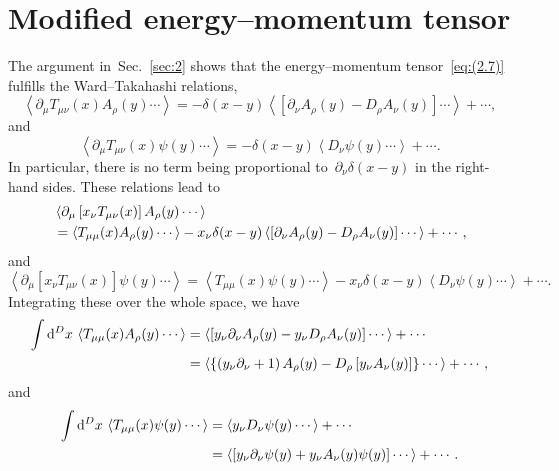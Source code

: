 \section{Modified energy--momentum tensor}
\label{sec:E}
The argument in~Sec.~\ref{sec:2} shows that the energy--momentum
tensor~\eqref{eq:(2.7)} fulfills the Ward--Takahashi relations,
\begin{equation}
   \left\langle\partial_\mu T_{\mu\nu}(x)A_\rho(y)\dotsm\right\rangle
   =-\delta(x-y)
   \left\langle\left[\partial_\nu A_\rho(y)
   -D_\rho A_\nu(y)\right]\dotsm\right\rangle+\dotsb,
\label{eq:(E1)}
\end{equation}
and
\begin{equation}
   \left\langle\partial_\mu T_{\mu\nu}(x)\psi(y)\dotsm\right\rangle
   =-\delta(x-y)
   \left\langle D_\nu \psi(y)\dotsm\right\rangle+\dotsb.
\label{eq:(E2)}
\end{equation}
In particular, there is no term being proportional
to~$\partial_\nu\delta(x-y)$ in the right-hand sides. These relations lead to
\begin{align}
   &\left\langle\partial_\mu\left[x_\nu T_{\mu\nu}(x)\right]
   A_\rho(y)\dotsm\right\rangle
\notag\\
   &=\left\langle T_{\mu\mu}(x)
   A_\rho(y)\dotsm\right\rangle
   -x_\nu\delta(x-y)
   \left\langle\left[\partial_\nu A_\rho(y)
   -D_\rho A_\nu(y)\right]\dotsm\right\rangle+\dotsb,
\label{eq:(E3)}
\end{align}
and
\begin{equation}
   \left\langle\partial_\mu\left[x_\nu T_{\mu\nu}(x)\right]
   \psi(y)\dotsm\right\rangle
   =\left\langle T_{\mu\mu}(x)
   \psi(y)\dotsm\right\rangle
   -x_\nu\delta(x-y)
   \left\langle D_\nu \psi(y)\dotsm\right\rangle+\dotsb.
\label{eq:(E4)}
\end{equation}
Integrating these over the whole space, we have
\begin{align}
   \int\mathrm{d}^Dx\,
   \left\langle T_{\mu\mu}(x)
   A_\rho(y)\dotsm\right\rangle
   &=\left\langle\left[y_\nu\partial_\nu A_\rho(y)
   -y_\nu D_\rho A_\nu(y)\right]\dotsm\right\rangle+\dotsb
\notag\\
   &=\left\langle\left\{\left(y_\nu\partial_\nu+1\right) A_\rho(y)
   -D_\rho\left[y_\nu A_\nu(y)\right]\right\}\dotsm\right\rangle+\dotsb,
\label{eq:(E5)}
\end{align}
and
\begin{align}
   \int\mathrm{d}^Dx\,\left\langle T_{\mu\mu}(x)
   \psi(y)\dotsm\right\rangle
   &=\left\langle y_\nu D_\nu \psi(y)\dotsm\right\rangle+\dotsb
\notag\\
   &=\left\langle\left[y_\nu\partial_\nu\psi(y)+y_\nu A_\nu(y)\psi(y)\right]
   \dotsm\right\rangle+\dotsb.
\label{eq:(E6)}
\end{align}

